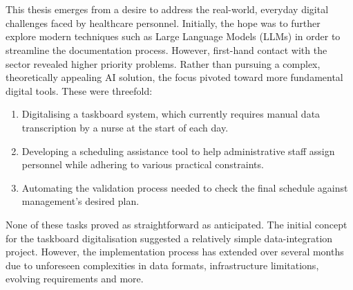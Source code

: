 \\
\\
This thesis emerges from a desire to address the real-world, everyday digital challenges faced by healthcare personnel. Initially, the hope was to further explore modern techniques such as Large Language Models (LLMs) in order to streamline the documentation process. However, first-hand contact with the sector revealed higher priority problems. Rather than pursuing a complex, theoretically appealing AI solution, the focus pivoted toward more fundamental digital tools. These were threefold:
\begin{enumerate}
    \item Digitalising a taskboard system, which currently requires manual data transcription by a nurse at the start of each day.
    \item Developing a scheduling assistance tool to help administrative staff assign personnel while adhering to various practical constraints.
    \item Automating the validation process needed to check the final schedule against management's desired plan.
\end{enumerate}
None of these tasks proved as straightforward as anticipated. The initial concept for the taskboard digitalisation suggested a relatively simple data-integration project. However, the implementation process has extended over several months due to unforeseen complexities in data formats, infrastructure limitations, evolving requirements and more.

